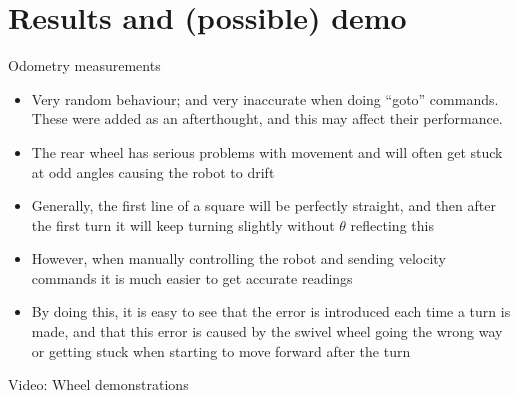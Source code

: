 \documentclass[12pt]{beamer}
\begin{document}
\section{Results and (possible) demo}
\begin{frame}{Odometry measurements}
  \begin{itemize}
  \item<+-> Very random behaviour; and very inaccurate when doing ``goto'' commands. These were added as an afterthought, and this may affect their performance.
  \item<+-> The rear wheel has serious problems with movement and will often get stuck at odd angles causing the robot to drift
  \item<+-> Generally, the first line of a square will be perfectly straight, and then after the first turn it will keep turning slightly without $\theta$ reflecting this
  \item<+-> However, when manually controlling the robot and sending velocity commands it is much easier to get accurate readings
    \item<+-> By doing this, it is easy to see that the error is introduced each time a turn is made, and that this error is caused by the swivel wheel going the wrong way or getting stuck when starting to move forward after the turn
  \end{itemize}
\end{frame}
\begin{frame}{Video: Wheel demonstrations}
  \begin{centering}
  \end{centering}
\end{frame}
{ \smaller
  
  }
\end{document}
